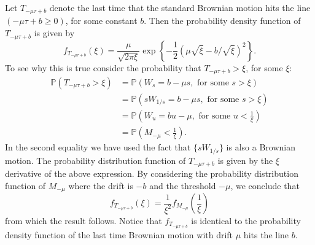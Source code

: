 \documentclass[useAMS]{mn2e}
\begin{document}
\begin{appendix}
Let $T_{-\mu \tau+b}$ denote the last time that the 
standard Brownian motion hits 
the line $(-\mu \tau +b \geq0)$, for some constant $b$. 
Then the probability density function of $T_{-\mu \tau+b}$ is given by 
\begin{equation}
f_{T_{-\mu \tau+b}}(\xi)=\frac{\mu}{\sqrt{2\pi \xi}}\exp\left\{-\frac{1}{2}\left(\mu\sqrt{\xi}-b/\sqrt{\xi}\right)^{2}\right\}.
\end{equation}
To see why this is true consider the probability
that $T_{-\mu \tau+b}> \xi$, for some $\xi$:
\begin{align*}
\mathbb{P}\left(T_{-\mu \tau+b}>\xi\right)&=\mathbb{P}
\left(W_{s}=b-\mu s,\text{ for some  }s>\xi\right) \\
&=\mathbb{P}\left(sW_{1/s}=b-\mu s,\text{ for some  } s>\xi\right) \\
&=\mathbb{P}\left(W_{u}=b u-\mu,\text{ for some  }u<\frac{1}{\xi}\right) \\
&=\mathbb{P}\left(M_{-\mu}<\frac{1}{\xi}\right).
\end{align*}
In the second equality we have used the fact that $\{sW_{1/s}\}$ is
also a
Brownian motion. The probability distribution function of 
$T_{-\mu \tau+b}$ is given by the $\xi$
 derivative of the above expression. By considering the probability
 distribution function of $M_{-\mu}$ where the drift is $-b$ and the
 threshold $-\mu$, we conclude that
\begin{equation}
f_{T_{-\mu \tau+b}}(\xi)=\frac{1}{\xi^2}f_{M_{-\mu}}\left(\frac{1}{\xi}\right)
\end{equation}
from which the result follows.
Notice that $f_{T_{-\mu \tau+b}}$ is identical to the 
probability density function of the last time Brownian motion 
with drift $\mu$ hits the line $b$.  


\end{appendix}
\end{document}
